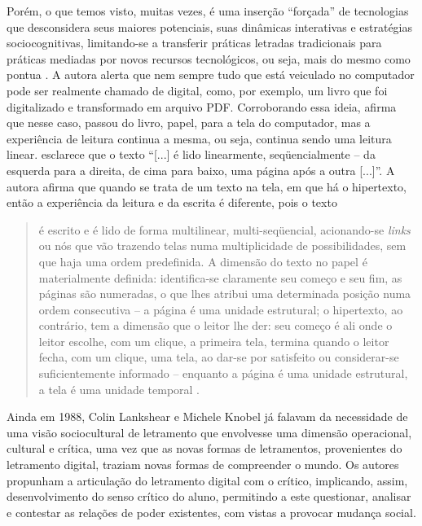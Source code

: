 \documentclass{textolivre}
\begin{document}
Porém, o que temos visto, muitas vezes, é uma inserção “forçada” de tecnologias
que desconsidera seus maiores potenciais, suas dinâmicas interativas e
estratégias sociocognitivas, limitando-se a transferir práticas letradas
tradicionais para práticas mediadas por novos recursos tecnológicos, ou seja,
mais do mesmo como pontua \textcite{barreto2017}. A autora alerta que nem sempre tudo
que está veiculado no computador pode ser realmente chamado de digital, como,
por exemplo, um livro que foi digitalizado e transformado em arquivo PDF.
Corroborando essa ideia, \textcite{rojo2016} afirma que nesse caso, passou do livro,
papel, para a tela do computador, mas a experiência de leitura continua a
mesma, ou seja, continua sendo uma leitura linear. \textcite[p. 150]{soares2002}
esclarece que o texto “[...] é lido linearmente, seqüencialmente – da esquerda
para a direita, de cima para baixo, uma página após a outra [...]”. A autora
afirma que quando se trata de um texto na tela, em que há o hipertexto, então a
experiência da leitura e da escrita é diferente, pois o texto
\begin{quote}
é escrito e é lido de forma multilinear, multi-seqüencial,
acionando-se \emph{links} ou nós que vão trazendo telas numa multiplicidade de
possibilidades, sem que haja uma ordem predefinida. A dimensão do texto no
papel é materialmente definida: identifica-se claramente seu começo e seu fim,
as páginas são numeradas, o que lhes atribui uma determinada posição numa ordem
consecutiva – a página é uma unidade estrutural; o hipertexto, ao contrário,
tem a dimensão que o leitor lhe der: seu começo é ali onde o leitor escolhe,
com um clique, a primeira tela, termina quando o leitor fecha, com um clique,
uma tela, ao dar-se por satisfeito ou considerar-se suficientemente informado –
enquanto a página é uma unidade estrutural, a tela é uma unidade temporal
\cite[p. 150]{soares2002}.
\end{quote}

Ainda em 1988, Colin Lankshear e Michele Knobel já falavam da necessidade de
uma visão sociocultural de letramento que envolvesse uma dimensão operacional,
cultural e crítica, uma vez que as novas formas de letramentos, provenientes do
letramento digital, traziam novas formas de compreender o mundo. Os autores
propunham a articulação do letramento digital com o crítico, implicando, assim,
desenvolvimento do senso crítico do aluno, permitindo a este questionar,
analisar e contestar as relações de poder existentes, com vistas a provocar
mudança social.
\end{document}
